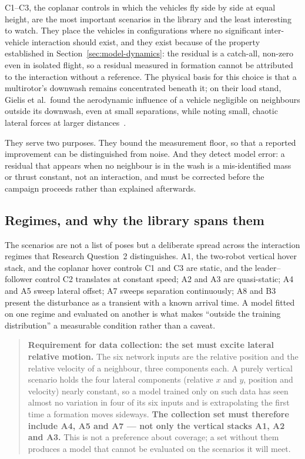 C1--C3, the coplanar controls in which the vehicles fly side by side at equal height, are the most
important scenarios in the library and the least interesting to watch. They
place the vehicles in configurations where no significant inter-vehicle interaction should exist,
and they exist because of the property established in Section~\ref{sec:model-dynamics}: the
residual is a catch-all, non-zero even in isolated flight, so a residual measured in formation
cannot be attributed to the interaction without a reference.
The physical basis for this choice is that a multirotor's downwash remains concentrated beneath
it; on their load stand, Gielis et al.\ found the aerodynamic influence of a vehicle negligible on
neighbours outside its downwash, even at small separations, while noting small, chaotic lateral
forces at larger distances~\cite{gielis2023aggregate}.

They serve two purposes. They bound the measurement floor, so that a reported improvement can be
distinguished from noise. And they detect model error: a residual that appears when no neighbour is
in the wash is a mis-identified mass or thrust constant, not an interaction, and must be corrected
before the campaign proceeds rather than explained afterwards.

\subsection{Regimes, and why the library spans them}

The scenarios are not a list of poses but a deliberate spread across the interaction regimes that
Research Question~2 distinguishes. A1, the two-robot vertical hover stack, and the coplanar
hover controls C1 and C3 are static, and the leader--follower control C2 translates at constant
speed; A2 and A3 are quasi-static; A4 and A5
sweep lateral offset; A7 sweeps separation continuously; A8 and B3 present the disturbance as a
transient with a known arrival time. A model fitted on one regime and evaluated on another is what
makes ``outside the training distribution'' a measurable condition rather than a caveat.

\begin{quote}
\textbf{Requirement for data collection: the set must excite lateral relative motion.}
The six network inputs are the relative position and the relative velocity of a neighbour, three
components each. A purely vertical scenario holds the four lateral components (relative $x$ and $y$,
position and velocity) nearly constant, so a model trained only on such data has seen almost no
variation in four of its six inputs and is extrapolating the first time a formation moves sideways. \textbf{The collection set must therefore include A4, A5
and A7 --- not only the vertical stacks A1, A2 and A3.} This is not a preference about coverage; a
set without them produces a model that cannot be evaluated on the scenarios it will meet.
\end{quote}

